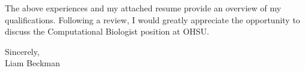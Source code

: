 \vspace*{\baselineskip}

The above experiences and my attached resume provide an overview of my qualifications. Following a review, I would greatly appreciate the opportunity to discuss the Computational Biologist position at OHSU.

\vspace*{2\baselineskip}

Sincerely,\\

Liam Beckman



